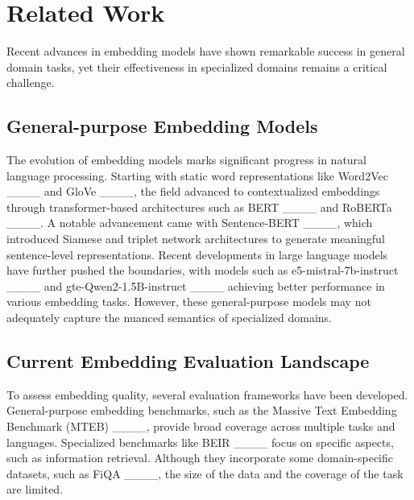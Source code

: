 \section{Related Work}
Recent advances in embedding models have shown remarkable success in general domain tasks, yet their effectiveness in specialized domains remains a critical challenge. 

\subsection{General-purpose Embedding Models}
The evolution of embedding models marks significant progress in natural language processing. Starting with static word representations like Word2Vec ____ and GloVe ____, the field advanced to contextualized embeddings through transformer-based architectures such as BERT ____ and RoBERTa ____. A notable advancement came with Sentence-BERT ____, which introduced Siamese and triplet network architectures to generate meaningful sentence-level representations. Recent developments in large language models have further pushed the boundaries, with models such as e5-mistral-7b-instruct ____ and gte-Qwen2-1.5B-instruct ____ achieving better performance in various embedding tasks. However, these general-purpose models may not adequately capture the nuanced semantics of specialized domains.

\subsection{Current Embedding Evaluation Landscape}
To assess embedding quality, several evaluation frameworks have been developed. General-purpose embedding benchmarks, such as the Massive Text Embedding Benchmark (MTEB) ____, provide broad coverage across multiple tasks and languages. Specialized benchmarks like BEIR ____ focus on specific aspects, such as information retrieval. Although they incorporate some domain-specific datasets, such as FiQA ____, the size of the data and the coverage of the task are limited. 


